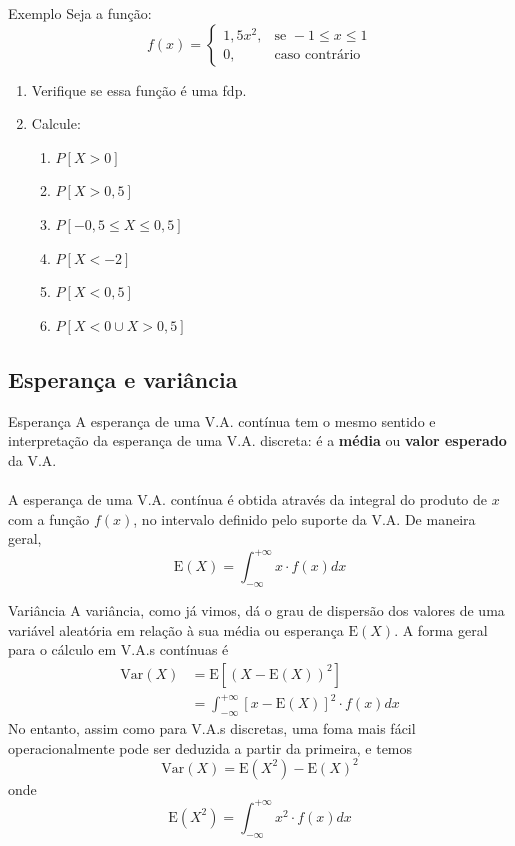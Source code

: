 \documentclass[10pt]{beamer}\usepackage[]{graphicx}\usepackage[]{color}
\providecommand{\E}{\text{E}}
\providecommand{\Var}{\text{Var}}
\theoremstyle{definition}
\begin{document}
\begin{frame}[fragile]{Exemplo}
  Seja a função:
  \[
    f(x)=
    \begin{cases}
      1,5 x^2, & \text{se } -1 \leq x \leq 1 \\
      0,              & \text{caso contrário}
    \end{cases}
  \]
  \begin{enumerate}
  \item Verifique se essa função é uma fdp.
  \item Calcule:
    \begin{enumerate}
    \item $P[X > 0]$
    \item $P[X > 0,5]$
    \item $P[-0,5 \leq X \leq 0,5]$
    \item $P[X < -2]$
    \item $P[X < 0,5]$
    \item $P[X < 0 \cup X > 0,5]$
    \end{enumerate}
  \end{enumerate}
\end{frame}

\subsection{Esperança e variância}

\begin{frame}[fragile]{Esperança}
  A esperança de uma V.A. contínua tem o mesmo sentido e interpretação
  da esperança de uma V.A. discreta: é a \textbf{média} ou \textbf{valor
    esperado} da V.A. \\~\\
  A esperança de uma V.A. contínua é obtida através da integral do
  produto de $x$ com a função $f(x)$, no intervalo definido pelo suporte
  da V.A. De maneira geral,
  \begin{equation*}
    \E(X) = \int_{-\infty}^{+\infty} x \cdot f(x) dx
  \end{equation*}
\end{frame}

\begin{frame}[fragile]{Variância}
  A variância, como já vimos, dá o grau de dispersão
  dos valores de uma variável aleatória em relação à sua média ou
  esperança $\E(X)$.  A forma geral para o cálculo em V.A.s contínuas é
  \begin{align*}
    \Var(X) &= \E[(X -  \E(X))^2] \\
      &= \int_{-\infty}^{+\infty} [x - \E(X)]^2 \cdot f(x) dx
  \end{align*}
  No entanto, assim como para V.A.s discretas, uma foma mais fácil
  operacionalmente pode ser deduzida a partir da primeira, e temos
  \begin{equation*}
    \Var(X) = \E(X^2) - \E(X)^2
  \end{equation*}
  onde
  \begin{equation*}
    \E(X^2) = \int_{-\infty}^{+\infty} x^2 \cdot f(x) dx
  \end{equation*}
\end{frame}
\end{document}
